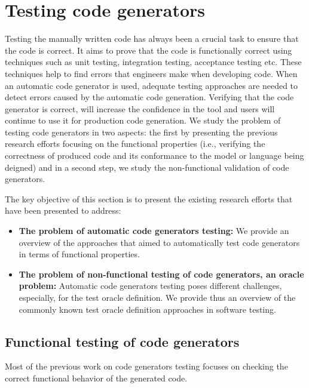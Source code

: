 \section{Testing code generators}
\label{sec:Testing code generators}
Testing the manually written code has always been a crucial task to ensure that the code is correct. It aims to prove that the code is functionally correct using techniques such as unit testing, integration testing, acceptance testing etc. These techniques help to find errors that engineers make when developing code.
When an automatic code generator is used, adequate testing approaches are needed to detect errors caused by the automatic code generation. Verifying that the code generator is correct, will increase the confidence in the tool and users will continue to use it for production code generation. 
We study the problem of testing code generators in two aspects: the first by presenting the previous research efforts focusing on the functional properties (i.e., verifying the correctness of produced code and its conformance to the model or language being deigned) and in a second step, we study the non-functional validation of code generators. 

The key objective of this section is to present the existing research efforts that have been presented to address:
\begin{itemize}
	\item \textbf{The problem of automatic code generators testing:}  We provide an overview of the approaches that aimed to automatically test code generators in terms of functional properties.
	
	\item \textbf{The problem of non-functional testing of code generators, an oracle problem:} Automatic code generators testing poses different challenges, especially, for the test oracle definition. We provide thus an overview of the commonly known test oracle definition approaches in software testing. 
\end{itemize}

\subsection{Functional testing of code generators}
\label{sec: Functional testing of code generators}

Most of the previous work on code generators testing focuses on checking the correct functional behavior of the generated code\cite{stuermer2007systematic,zelenov2006automatic,conrad2009testing,conrad2010code,jorges2014back,burnard2004verifying,sturmer2003test}. 

